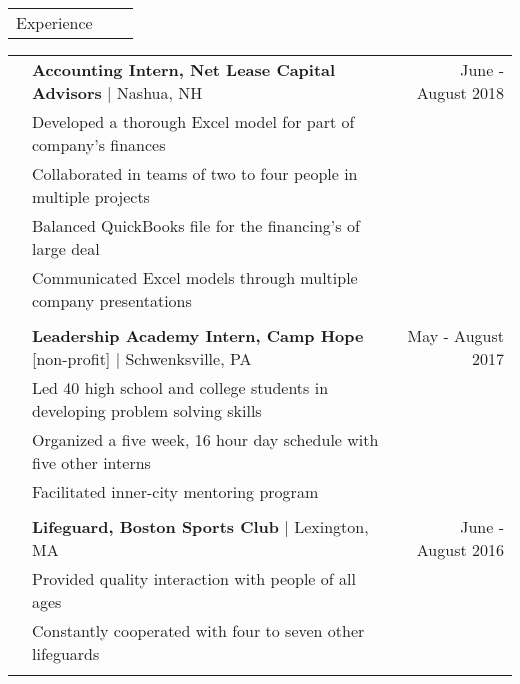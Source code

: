 \documentclass[letterpaper,10pt,oneside]{article}
\begin{document}
 \noindent \begin{tabularx}{\linewidth}{@{} l l R }
     \Large{Experience}\\
 \end{tabularx}     
 \noindent \begin{tabularx}{\linewidth}{@{} l l R }     
     & \textbf{Accounting Intern, Net Lease Capital Advisors} $\mid$ Nashua, NH & June - August 2018 \\
     &Developed a thorough Excel model for part of company's finances\\
     &Collaborated in teams of two to four people in multiple projects\\
     &Balanced QuickBooks file for the financing's of large deal\\
     &Communicated Excel models through multiple company presentations\\
     & \\
     &\textbf{Leadership Academy Intern, Camp Hope} [non-profit] $\mid$ Schwenksville, PA & May - August 2017\\
     &Led 40 high school and college students in developing problem solving skills\\
     &Organized a five
week, 16 hour day schedule with five other interns\\
	&Facilitated inner-city mentoring program\\
     &\\
     &\textbf{Lifeguard, Boston Sports Club} $\mid$ Lexington, MA & June - August 2016 \\
     &Provided quality interaction with people of all ages\\
     &Constantly cooperated with four to seven other lifeguards\\
     &\\
 \end{tabularx}     


\newpage

\end{document}
